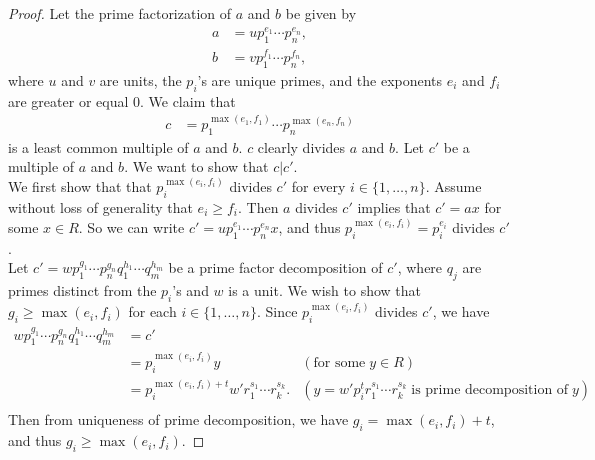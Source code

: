 \documentclass{article}
\begin{document}
  \begin{proof}
    Let the prime factorization of $a$ and $b$ be given by
    \begin{align*}
      a &= up_1^{e_1}\cdots p_n^{e_n}, \\
      b &= vp_1^{f_1}\cdots p_n^{f_n},
    \end{align*}
    where $u$ and $v$ are units, the $p_i$'s are unique primes, and the
    exponents $e_i$ and $f_i$ are greater or equal 0. We claim that
    \begin{align*}
      c &= p_1^{\max(e_1,f_1)}\cdots p_n^{\max(e_n,f_n)}
    \end{align*}
    is a least common multiple of $a$ and $b$. $c$ clearly divides $a$ and
    $b$. Let $c'$ be a multiple of $a$ and $b$. We want to show that
    $c|c'$. \\

    We first show that that $p_i^{\max(e_i,f_i)}$ divides $c'$ for every
    $i\in\{1,\ldots,n\}$. Assume without loss of generality that $e_i\geq
    f_i$. Then $a$ divides $c'$ implies that $c'=ax$ for some $x\in R$. So
    we can write $c'=up_1^{e_1}\cdots p_n^{e_n}x$, and thus
    $p_i^{\max(e_i,f_i)}=p_i^{e_i}$ divides $c'$. \\

    Let $c'=wp_1^{g_1}\cdots p_n^{g_n}q_1^{h_1}\cdots q_m^{h_m}$ be a prime
    factor decomposition of $c'$, where $q_j$ are primes distinct from the
    $p_i$'s and $w$ is a unit. We wish to show that $g_i\geq\max(e_i,f_i)$
    for each $i\in\{1,\ldots,n\}$. Since $p_i^{\max(e_i,f_i)}$ divides
    $c'$, we have 
    \begin{align*}
      wp_1^{g_1}\cdots p_n^{g_n}q_1^{h_1}\cdots q_m^{h_m}&=c' \\
        &=p_i^{\max(e_i,f_i)}y &(\text{for some}\; y\in R) \\
        &=p_i^{\max(e_i,f_i)+t} w'r_1^{s_1}\cdots r_k^{s_k}.
          &(y=w'p_i^tr_1^{s_1}\cdots r_k^{s_k}\; \text{is
          prime decomposition of}\; y) \\
    \end{align*}
    Then from uniqueness of prime decomposition, we have
    $g_i=\max(e_i,f_i)+t$, and thus $g_i\geq\max(e_i,f_i)$.
  \end{proof}
\end{document}
